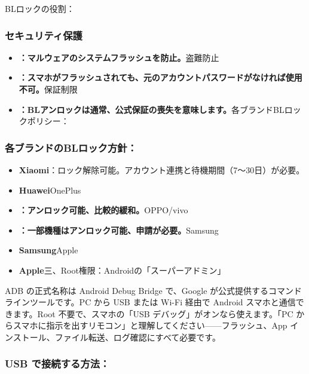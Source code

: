 BLロックの役割：

\subsubsection*{セキュリティ保護}

\begin{itemize}
  \item \textbf{：マルウェアのシステムフラッシュを防止。}盗難防止
  \item \textbf{：スマホがフラッシュされても、元のアカウントパスワードがなければ使用不可。}保証制限
  \item \textbf{：BLアンロックは通常、公式保証の喪失を意味します。}各ブランドBLロックポリシー：
\end{itemize}

\subsubsection*{各ブランドのBLロック方針：}

\begin{itemize}
  \item \textbf{Xiaomi}：ロック解除可能。アカウント連携と待機期間（7〜30日）が必要。
  \item \textbf{Huawei}OnePlus
  \item \textbf{：アンロック可能、比較的緩和。}OPPO/vivo
  \item \textbf{：一部機種はアンロック可能、申請が必要。}Samsung
  \item \textbf{Samsung}Apple
  \item \textbf{Apple}三、Root権限：Androidの「スーパーアドミン」
\end{itemize}


ADB の正式名称は Android Debug Bridge で、Google が公式提供するコマンドラインツールです。PC から USB または Wi-Fi 経由で Android スマホと通信できます。Root 不要で、スマホの「USB デバッグ」がオンなら使えます。「PC からスマホに指示を出すリモコン」と理解してください——フラッシュ、App インストール、ファイル転送、ログ確認にすべて必要です。

\subsubsection*{USB で接続する方法：}

